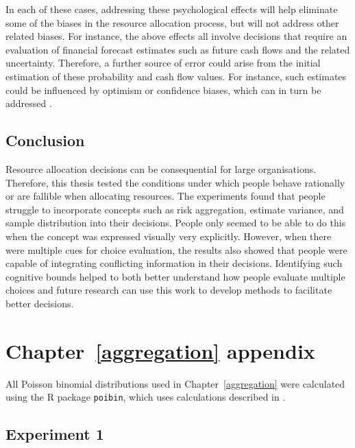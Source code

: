 \documentclass[a4paper, nobind, dvipsnames]{templates/ociamthesis}
\theoremstyle{definition}
\theoremstyle{definition}
\theoremstyle{definition}
\theoremstyle{definition}
\theoremstyle{remark}
\begin{document}
In each of these cases, addressing these psychological effects will help
eliminate some of the biases in the resource allocation process, but will not
address other related biases. For instance, the above effects all involve
decisions that require an evaluation of financial forecast estimates such as
future cash flows and the related uncertainty. Therefore, a further source of
error could arise from the initial estimation of these probability and cash flow
values. For instance, such estimates could be influenced by optimism or
confidence biases, which can in turn be addressed \autocite{flyvbjerg2018}.

\hypertarget{conclusion}{%
\section{Conclusion}\label{conclusion}}

Resource allocation decisions can be consequential for large organisations.
Therefore, this thesis tested the conditions under which people behave
rationally or are fallible when allocating resources. The experiments found that
people struggle to incorporate concepts such as risk aggregation, estimate
variance, and sample distribution into their decisions. People only seemed to be
able to do this when the concept was expressed visually very explicitly.
However, when there were multiple cues for choice evaluation, the results also
showed that people were capable of integrating conflicting information in their
decisions. Identifying such cognitive bounds helped to both better understand
how people evaluate multiple choices and future research can use this work to
develop methods to facilitate better decisions.

\hypertarget{appendix-appendix}{%
\appendix}


\hypertarget{aggregation-appendix}{%
\chapter{Chapter~\ref{aggregation} appendix}\label{aggregation-appendix}}

\minitoc

All Poisson binomial distributions used in Chapter~\ref{aggregation} were
calculated using the R package \texttt{poibin}, which uses calculations described in
\textcite{hong2013}.

\hypertarget{experiment-1-1}{%
\section{Experiment 1}\label{experiment-1-1}}
\end{document}
